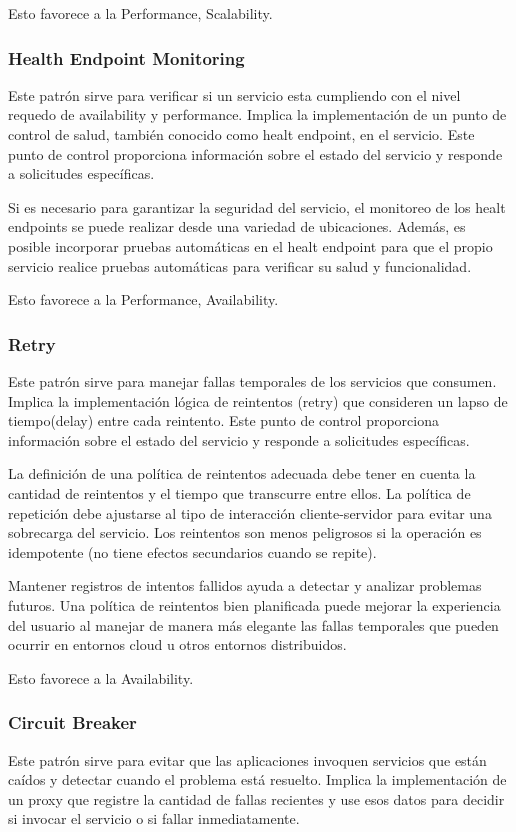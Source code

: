 \documentclass{article}
\begin{document}
		Esto favorece a la Performance, Scalability.
		
		\subsubsection{Health Endpoint Monitoring}
		Este patrón sirve para verificar si un servicio esta cumpliendo con el nivel requedo de availability y performance. Implica la implementación de un punto de control de salud, también conocido como healt endpoint, en el servicio. Este punto de control proporciona información sobre el estado del servicio y responde a solicitudes específicas.
		
		Si es necesario para garantizar la seguridad del servicio, el monitoreo de los healt endpoints se puede realizar desde una variedad de ubicaciones. Además, es posible incorporar pruebas automáticas en el healt endpoint para que el propio servicio realice pruebas automáticas para verificar su salud y funcionalidad.
		
		
		Esto favorece a la Performance, Availability.
		
		\subsubsection{Retry}
		Este patrón sirve para manejar fallas temporales de los servicios que consumen. Implica la implementación lógica de reintentos (retry) que consideren un lapso de tiempo(delay) entre cada reintento. Este punto de control proporciona información sobre el estado del servicio y responde a solicitudes específicas.
		
		La definición de una política de reintentos adecuada debe tener en cuenta la cantidad de reintentos y el tiempo que transcurre entre ellos. La política de repetición debe ajustarse al tipo de interacción cliente-servidor para evitar una sobrecarga del servicio. Los reintentos son menos peligrosos si la operación es idempotente (no tiene efectos secundarios cuando se repite).
		
		Mantener registros de intentos fallidos ayuda a detectar y analizar problemas futuros. Una política de reintentos bien planificada puede mejorar la experiencia del usuario al manejar de manera más elegante las fallas temporales que pueden ocurrir en entornos cloud u otros entornos distribuidos.
		
		
		Esto favorece a la Availability.
		
		\subsubsection{Circuit Breaker}
		Este patrón sirve para evitar que las aplicaciones invoquen servicios que están caídos y detectar cuando el problema está resuelto. Implica la implementación de un proxy que registre la	cantidad de fallas recientes y use esos	datos para decidir si invocar el servicio o	si fallar inmediatamente.
		
\end{document}
